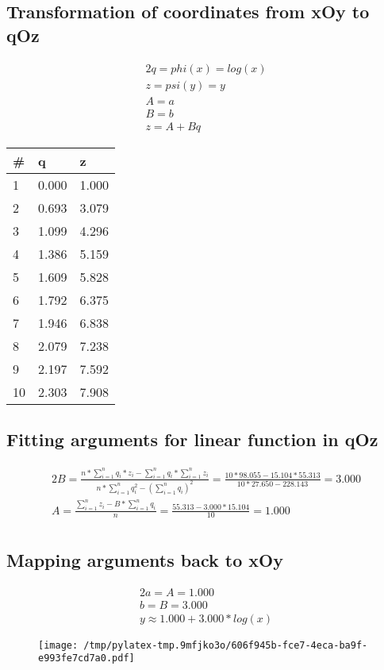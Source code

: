 \documentclass{article}%
\begin{document}
\subsection{Transformation of coordinates from xOy to qOz}%
\label{subsec:TransformationofcoordinatesfromxOytoqOz}%
\begin{alignat*}{2}%
q = phi(x) = log(x) \\%
z = psi(y) = y \\%
A = a \\%
B = b \\%
z = A + Bq%
\end{alignat*}

%
\begin{longtable}{l l l}%
\hline%
\#&q&z\\%
\hline%
\endhead%
1&0.000&1.000\\%
2&0.693&3.079\\%
3&1.099&4.296\\%
4&1.386&5.159\\%
5&1.609&5.828\\%
6&1.792&6.375\\%
7&1.946&6.838\\%
8&2.079&7.238\\%
9&2.197&7.592\\%
10&2.303&7.908\\%
\end{longtable}%
\subsection{Fitting arguments for linear function in qOz}%
\label{subsec:FittingargumentsforlinearfunctioninqOz}%
\begin{alignat*}{2}%
B
                    = \frac {n * \sum\limits_{i = 1}^n {q_i * z_i} - \sum\limits_{i = 1}^n {q_i} * \sum\limits_{i = 1}^n {z_i}}
                        {n * \sum\limits_{i = 1}^n {q_i^2} - (\sum\limits_{i = 1}^n {q_i}) ^ 2}
                    = \frac {10 * 98.055 - 15.104 * 55.313}
                        {10 * 27.650 - 228.143}
                    = 3.000 \\%
A
                    = \frac {\sum\limits_{i = 1}^n {z_i} - B * \sum\limits_{i = 1}^{n} {q_i}} n
                    = \frac {55.313 - 3.000 * 15.104} {10}
                    = 1.000 \\%
\end{alignat*}

%
\subsection{Mapping arguments back to xOy}%
\label{subsec:MappingargumentsbacktoxOy}%
\begin{alignat*}{2}%
a = A = 1.000 \\%
b = B = 3.000 \\%
y \approx1.000 + 3.000 * log(x)%
\end{alignat*}%


\begin{figure}[htbp]%
\centering%
\texttt{[image: /tmp/pylatex-tmp.9mfjko3o/606f945b-fce7-4eca-ba9f-e993fe7cd7a0.pdf]}%
\end{figure}

%
\end{document}
